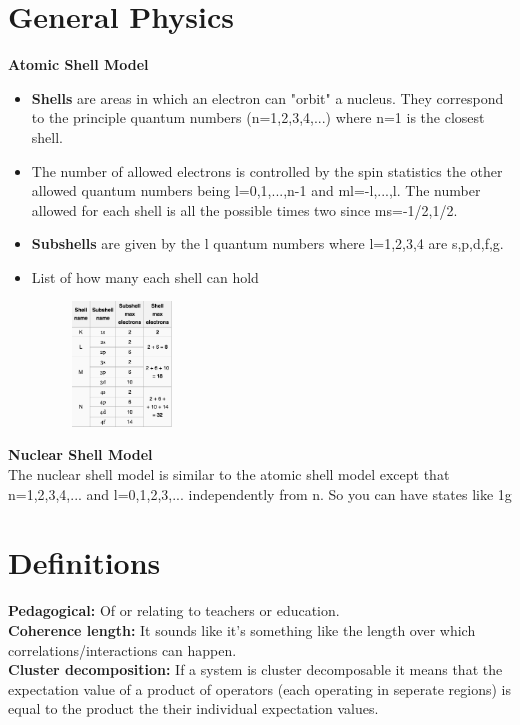 \documentclass[12pt]{extarticle}
\begin{document}
\section*{General Physics}
\textbf{Atomic Shell Model}
\begin{itemize}
   \item \textbf{Shells} are areas in which an electron can "orbit" a nucleus. They correspond to the principle quantum numbers (n=1,2,3,4,...) where n=1 is the closest shell.
   \item The number of allowed electrons is controlled by the spin statistics the other allowed quantum numbers being l=0,1,...,n-1 and ml=-l,...,l. The number allowed for each shell is all the possible times two since ms=-1/2,1/2.
   \item \textbf{Subshells} are given by the l quantum numbers where l=1,2,3,4 are s,p,d,f,g.
   \item List of how many each shell can hold
   \begin{figure}[h!]
      \includegraphics[width=0.25\textwidth]{shell.png}
   \end{figure}
\end{itemize}
\textbf{Nuclear Shell Model} \\
The nuclear shell model is similar to the atomic shell model except that n=1,2,3,4,... and l=0,1,2,3,... independently from n. So you can have states like 1g

\section*{Definitions}
\textbf{Pedagogical:} Of or relating to teachers or education. \\
\textbf{Coherence length:} It sounds like it's something like the length over which correlations/interactions can happen. \\
\textbf{Cluster decomposition:} If a system is cluster decomposable it means that the expectation value of a product of operators (each operating in seperate regions) is equal to the product the their individual expectation values.
 
\end{document}
